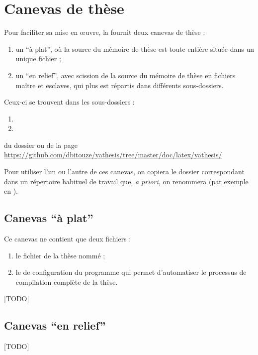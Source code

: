 \chapter{Canevas de thèse}\label{cha:canevas}

Pour faciliter sa mise en œuvre, la \yatcl fournit deux canevas de thèse :
\begin{enumerate}
\item un \enquote{à plat}, où la source  du mémoire de thèse est
  toute entière située dans un unique fichier ;
\item un \enquote{en relief}, avec scission de la source  du mémoire
  de thèse en fichiers maître et esclaves, qui plus est répartis dans
  différents sous-dossiers.
\end{enumerate}
Ceux-ci se trouvent dans les sous-dossiers :
\begin{enumerate}
\item {}
\item {}
\end{enumerate}
du dossier  ou de la page
\url{https://github.com/dbitouze/yathesis/tree/master/doc/latex/yathesis/}

Pour utiliser l'un ou l'autre de ces canevas, on copiera le dossier
correspondant dans un répertoire habituel de travail que, \emph{a
  priori}, on renommera (par exemple en ).

\section{Canevas  \enquote{à plat}}
\label{sec:canevas-a-plat}

Ce canevas ne contient que deux fichiers :
\begin{enumerate}
\item le fichier de la thèse nommé  ;
\item le  de configuration du programme
   qui permet d'automatiser le processus de compilation
  complète de la thèse.
\end{enumerate}

[TODO]

\section{Canevas \enquote{en relief}}
\label{sec:canevas-relief}

[TODO]

%
\iffalse
\fi
